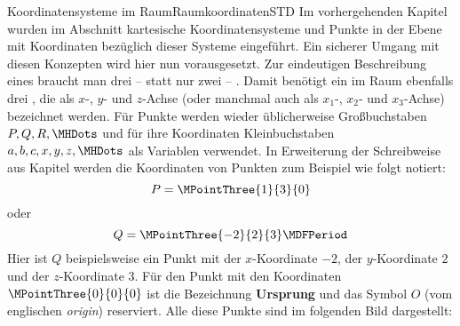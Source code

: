 \begin{MXContent}{Koordinatensysteme im Raum}{Raumkoordinaten}{STD}
Im vorhergehenden Kapitel  wurden im Abschnitt  kartesische Koordinatensysteme und Punkte in der Ebene mit Koordinaten bezüglich dieser Systeme eingeführt. Ein sicherer Umgang mit diesen Konzepten wird hier nun vorausgesetzt. Zur eindeutigen Beschreibung eines  braucht man drei -- statt nur zwei -- . Damit benötigt ein  im Raum ebenfalls drei , die als $x$-, $y$- und $z$-Achse (oder manchmal auch als $x_1$-, $x_2$- und $x_3$-Achse) bezeichnet werden. Für Punkte werden wieder üblicherweise Großbuchstaben $P,Q,R,\MHDots$ und für ihre Koordinaten Kleinbuchstaben $a,b,c,x,y,z,\MHDots$ als Variablen verwendet. In Erweiterung der Schreibweise aus Kapitel  werden die Koordinaten von Punkten zum Beispiel wie folgt notiert:
\[
 P=\MPointThree{1}{3}{0}
\]
oder
\[
 Q=\MPointThree{-2}{2}{3}\MDFPeriod
\]
Hier ist $Q$ beispielsweise ein Punkt mit der $x$-Koordinate $-2$, der $y$-Koordinate $2$ und der $z$-Koordinate $3$. Für den Punkt mit den Koordinaten $\MPointThree{0}{0}{0}$ ist die Bezeichnung \textbf{Ursprung} und das Symbol $O$ (vom englischen \textit{origin}) reserviert. Alle diese Punkte sind im folgenden Bild dargestellt:  


\end{MXContent}
